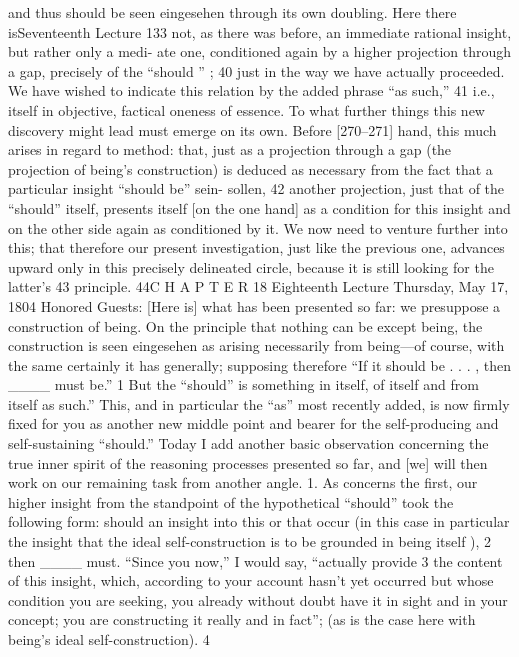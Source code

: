 and thus should be seen {eingesehen} through its own doubling. Here there isSeventeenth Lecture
133
not, as there was before, an immediate rational insight, but rather only a medi-
ate one, conditioned again by a higher projection through a gap, precisely of
the “should ” ; 40 just in the way we have actually proceeded. We have wished to
indicate this relation by the added phrase “as such,” 41 i.e., itself in objective,
factical oneness of essence.
To what further things this new discovery might lead must emerge on
its own. Before [270–271] hand, this much arises in regard to method: that,
just as a projection through a gap (the projection of being’s construction) is
deduced as necessary from the fact that a particular insight “should be” {sein-
sollen}, 42 another projection, just that of the “should” itself, presents itself [on
the one hand] as a condition for this insight and on the other side again as
conditioned by it. We now need to venture further into this; that therefore our
present investigation, just like the previous one, advances upward only in this
precisely delineated circle, because it is still looking for the latter’s 43 principle. 44C H A P T E R
18
Eighteenth Lecture
Thursday, May 17, 1804
Honored Guests:
[Here is] what has been presented so far: we presuppose a construction of
being. On the principle that nothing can be except being, the construction is
seen {eingesehen} as arising necessarily from being—of course, with the same
certainly it has generally; supposing therefore “If it should be . . . , then ____
must be.” 1 But the “should” is something in itself, of itself and from itself as
such.” This, and in particular the “as” most recently added, is now firmly fixed
for you as another new middle point and bearer for the self-producing and
self-sustaining “should.”
Today I add another basic observation concerning the true inner spirit
of the reasoning processes presented so far, and [we] will then work on our
remaining task from another angle.
1. As concerns the first, our higher insight from the standpoint of the
hypothetical “should” took the following form: should an insight into this or
that occur (in this case in particular the insight that the ideal self-construction
is to be grounded in being itself ), 2 then ____ must. “Since you now,” I would
say, “actually provide 3 the content of this insight, which, according to your
account hasn’t yet occurred but whose condition you are seeking, you already
without doubt have it in sight and in your concept; you are constructing it
really and in fact”; (as is the case here with being’s ideal self-construction). 4

